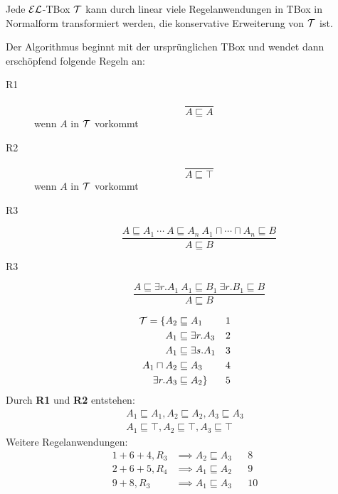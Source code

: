 \begin{lemma}
Jede $\mathcal{E}\mathcal{L}$-TBox $\mathcal{T}$ kann durch linear viele Regelanwendungen in TBox in
Normalform transformiert werden, die konservative Erweiterung von $\mathcal{T}$
ist.
\end{lemma}

\begin{tafel}[TODO]

\end{tafel}

Der Algorithmus beginnt mit der ursprünglichen TBox und wendet dann erschöpfend folgende Regeln an:

\begin{description}
    \item[R1] \[
        \frac{}{A \sqsubseteq A}
    \] wenn $A$ in $\mathcal{T}$ vorkommt
    \item[R2] \[
        \frac{}{A \sqsubseteq \top}
    \] wenn $A$ in $\mathcal{T}$ vorkommt
    \item[R3] \[
        \frac{
        A \sqsubseteq A_1\ \cdots\ A\sqsubseteq A_n\ A_1\sqcap \cdots \sqcap A_n \sqsubseteq B
        }{A \sqsubseteq B}
    \] 
    \item[R3] \[
        \frac{A \sqsubseteq \exists r.A_1\ A_1 \sqsubseteq B_1\ \exists r.B_1 \sqsubseteq B
        }{A \sqsubseteq B}
    \]
\end{description}

\begin{tafel}
    \begin{align*}
        \mathcal{T} = \{ A_2 &\sqsubseteq A_1 && 1\\
            A_1 &\sqsubseteq \exists r.A_3 && 2\\
            A_1 &\sqsubseteq \exists s.A_1 && 3\\
            A_1 \sqcap A_2 &\sqsubseteq A_3 && 4\\
        \exists r.A_3 & \sqsubseteq A_2\} && 5
    \end{align*}
    Durch \textbf{R1} und \textbf{R2} entstehen:
    \begin{align*}
        A_1 \sqsubseteq A_1, A_2 \sqsubseteq A_2, A_3 \sqsubseteq A_3\\
        A_1 \sqsubseteq \top, A_2 \sqsubseteq \top, A_3 \sqsubseteq \top
    \end{align*}
    Weitere Regelanwendungen:
    \begin{align*}
        1 + 6 + 4, R_3 &\implies A_2 \sqsubseteq A_3 && 8\\
        2 + 6 + 5, R_4 &\implies A_1 \sqsubseteq A_2 && 9\\
        9 + 8, R_3 &\implies A_1 \sqsubseteq A_3 && 10\\
    \end{align*}
\end{tafel}


